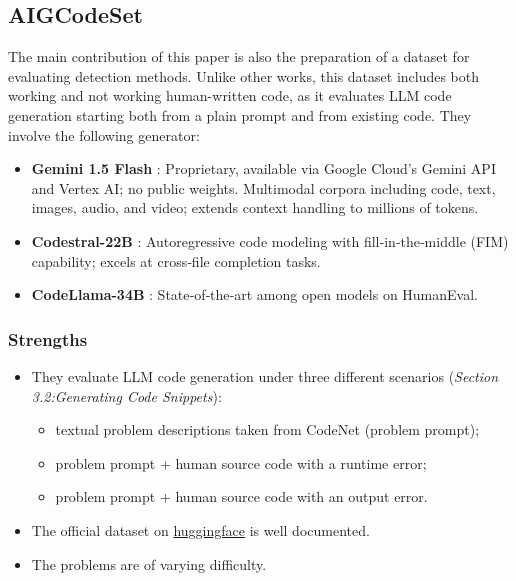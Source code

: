 \subsection{AIGCodeSet}
\label{section:AiGCodeSet}
The main contribution of this paper is also the preparation 
of a dataset for evaluating detection methods. Unlike other 
works, this dataset includes both working and not working 
human-written code, as it evaluates LLM code generation starting 
both from a plain prompt and from existing code.
They involve the following generator:

\begin{itemize}
    \item \textbf{Gemini 1.5 Flash} \cite{team2024gemini} : 
    Proprietary, available via Google Cloud’s Gemini API and Vertex AI; 
    no public weights. Multimodal corpora including code, text, images, 
    audio, and video; extends context handling to millions of tokens. 
    \item \textbf{Codestral-22B} \cite{mistral-codestral-2024} : 
    Autoregressive code modeling with fill‑in‑the‑middle (FIM) 
    capability; excels at cross‑file completion tasks.
    \item \textbf{CodeLlama-34B} \cite{roziere2023code} :
    State‑of‑the‑art among open models on HumanEval.
\end{itemize}





\subsubsection*{Strengths}
\begin{itemize}
    \item They evaluate LLM code generation under three different scenarios 
    {(\scriptsize\textit{Section 3.2:Generating Code Snippets})}:
    \begin{itemize}
        \item textual problem descriptions taken from CodeNet (problem prompt);
        \item problem prompt + human source code with a runtime error;
        \item problem prompt + human source code with an output error.
    \end{itemize}
    \item The official dataset on 
    \href{{https://huggingface.co/datasets/basakdemirok/AIGCodeSet}}{huggingface}
    is well documented. 
    \item The problems are of varying difficulty.
\end{itemize}


